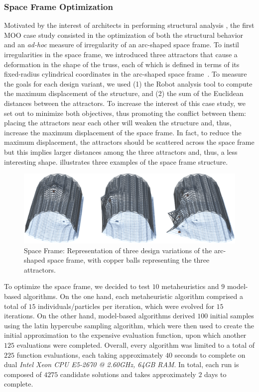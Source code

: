 \subsubsection{Space Frame Optimization}
Motivated by the interest of architects in performing structural analysis \cite{Cichocka2017SURVEY}, the first \ac{MOO} case study consisted in the optimization of both the structural behavior and an \textit{ad-hoc} measure of irregularity of an arc-shaped space frame. To instil irregularities in the space frame, we introduced three attractors that cause a deformation in the shape of the truss, each of which is defined in terms of its fixed-radius cylindrical coordinates in the arc-shaped space frame~\cite{Belem2019MOO}. To measure the goals for each design variant, we used (1) the Robot analysis tool to compute the maximum displacement of the structure, and (2) the sum of the Euclidean distances between the attractors. To increase the interest of this case study, we set out to minimize both objectives, thus promoting the conflict between them: placing the attractors near each other will weaken the structure and, thus, increase the maximum displacement of the space frame. In fact, to reduce the maximum displacement, the attractors should be scattered across the space frame but this implies larger distances among the three attractors and, thus, a less interesting shape.  illustrates three examples of the space frame structure. 
\begin{figure}[htbp]
	\centering
	\includegraphics[width=1\textwidth]{Images/Evaluation/truss-kat-small.png}
	\caption[Space Frame: Representation of three space frame design variants]{Space Frame: Representation of three design variations of the arc-shaped space frame, with copper balls representing the three attractors.}
	\label{fig:spaceframe}
\end{figure}

To optimize the space frame, we decided to test $10$ metaheuristics and $9$ model-based algorithms. On the one hand, each metaheuristic algorithm comprised a total of $15$ individuals/particles per iteration, which were evolved for $15$ iterations. On the other hand, model-based algorithms derived $100$ initial samples using the latin hypercube sampling algorithm, which were then used to create the initial approximation to the expensive evaluation function, upon which another $125$ evaluations were completed. Overall, every algorithm was limited to a total of $225$ function evaluations, each taking approximately $40$ seconds to complete on dual \textit{Intel Xeon CPU E5-2670 @ 2.60GHz, 64GB RAM}. In total, each run is composed of $4275$ candidate solutions and takes approximately $2$ days to complete.


